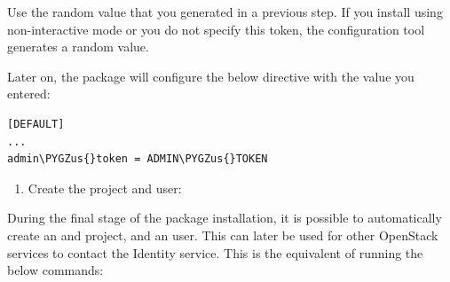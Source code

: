 \documentclass[letterpaper,10pt,english]{sphinxmanual}
\def\PYGZus{\char`\_}
\begin{document}
Use the random value that you generated in a previous step. If you
install using non-interactive mode or you do not specify this token, the
configuration tool generates a random value.

Later on, the package will configure the below directive with the value
you entered:

\begin{Verbatim}[commandchars=\\\{\}]
[DEFAULT]
...
admin\PYGZus{}token = ADMIN\PYGZus{}TOKEN
\end{Verbatim}
\begin{enumerate}
\item {} 
Create the  project and user:

\end{enumerate}

During the final stage of the package installation, it is possible to
automatically create an  and  project, and an  user.
This can later be used for other OpenStack services to contact the
Identity service. This is the equivalent of running the below commands:
\end{document}
